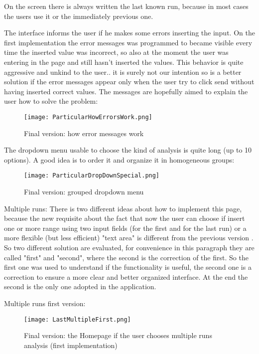 On the screen there is always written the last known run, because in most cases the users use it or the immediately previous one. 

The interface informs the user if he makes some errors inserting the input. On the first implementation the error messages was programmed to became visible every time the inserted value was incorrect, so also at the moment the user was entering in the page and still hasn't inserted the values. This behavior is quite aggressive and unkind to the user.. it is surely not our intention so is a better solution if the error messages appear only when the user try to click send without having inserted correct values. The messages are hopefully aimed to explain the user how to solve the problem:

\begin{figure}[H]
\centering
\texttt{[image: ParticularHowErrorsWork.png]} 
\caption{Final version: how error messages work}
\end{figure}    


\newpage
The dropdown menu usable to choose the kind of analysis is quite long (up to 10 options). A good idea is to order it and organize it in homogeneous groups:

\begin{figure}[H]
\centering
\texttt{[image: ParticularDropDownSpecial.png]} 
\caption{Final version: grouped dropdown menu}
\end{figure}    

  
Multiple runs:  
There is two different ideas about how to implement this page, because the new requisite about the fact that now the user can choose if insert one or more range using two input fields (for the first and for the last run) or a more flexible (but less efficient) "text area" is different from the previous version . So two different solution are evaluated, for convenience in this paragraph they are called "first" and "second", where the second is the correction of the first. So the first one was used to understand if the functionality is useful, the second one is a correction to ensure a more clear and better organized interface. At the end the second is the only one adopted in the application.

\newpage

Multiple runs first version:
\begin{figure}[H]
\centering
\texttt{[image: LastMultipleFirst.png]} 
\caption{Final version: the Homepage if the user chooses multiple runs analysis (first implementation)}
\end{figure}    

